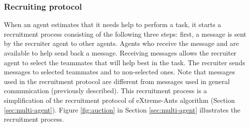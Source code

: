 \subsubsection{Recruiting protocol}
\label{sec:recruiting}
When an agent estimates that it needs help to perform a task, it starts a recruitment process consisting of the following three steps: first, a  message is sent by the recruiter agent to other agents. Agents who receive the  message and are available to help  send back a  message. 
Receiving  messages allows the recruiter agent to select the teammates that will help best in the task. 
The recruiter sends  messages to selected teammates and  to non-selected ones.  Note that  messages used in the recruitment protocol are different from  messages used in general communication (previously described). This recruitment process is a simplification of the recruitment protocol of eXtreme-Ants algorithm (Section \ref{sec:multi-agent}). Figure \ref{fig:auction} in Section \ref{sec:multi-agent} illustrates the recruitment process.


